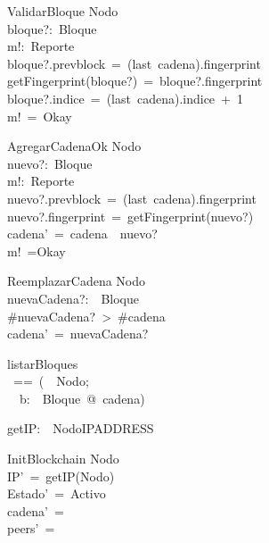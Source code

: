 \begin{schema}{ValidarBloque}
\Xi Nodo\\
bloque?:~Bloque\\
m!:~Reporte\\
\where
bloque?.prevblock~=~(last~cadena).fingerprint\\
getFingerprint(bloque?)~=~bloque?.fingerprint\\
bloque?.indice~=~(last~cadena).indice~+~1\\
m!~=~Okay\\
\end{schema}
\begin{schema}{AgregarCadenaOk}
\Delta Nodo\\
nuevo?:~Bloque\\
m!:~Reporte\\
\where
nuevo?.prevblock~=~(last~cadena).fingerprint\\
nuevo?.fingerprint~=~getFingerprint(nuevo?)\\
cadena'~=~cadena~\cat~\langle nuevo?\rangle\\
m!~=Okay\\
\end{schema}
\begin{schema}{ReemplazarCadena}
\Delta Nodo\\
nuevaCadena?:~\seq~Bloque\\
\where
\#nuevaCadena?~>~\#cadena\\
cadena'~=~nuevaCadena?\\
\end{schema}
\begin{zed}
listarBloques\\
~==~(~\lambda~Nodo;\\
~~b:~\seq~Bloque~@~cadena)\\
\end{zed}
\begin{axdef}
getIP:~\power~Nodo\fun IPADDRESS\\
\end{axdef}
\begin{schema}{InitBlockchain}
\Delta Nodo\\
\where
IP'~=~getIP(Nodo)\\
Estado'~=~Activo\\
cadena'~=~\langle\rangle\\
peers'~=~\emptyset\\
\end{schema}

